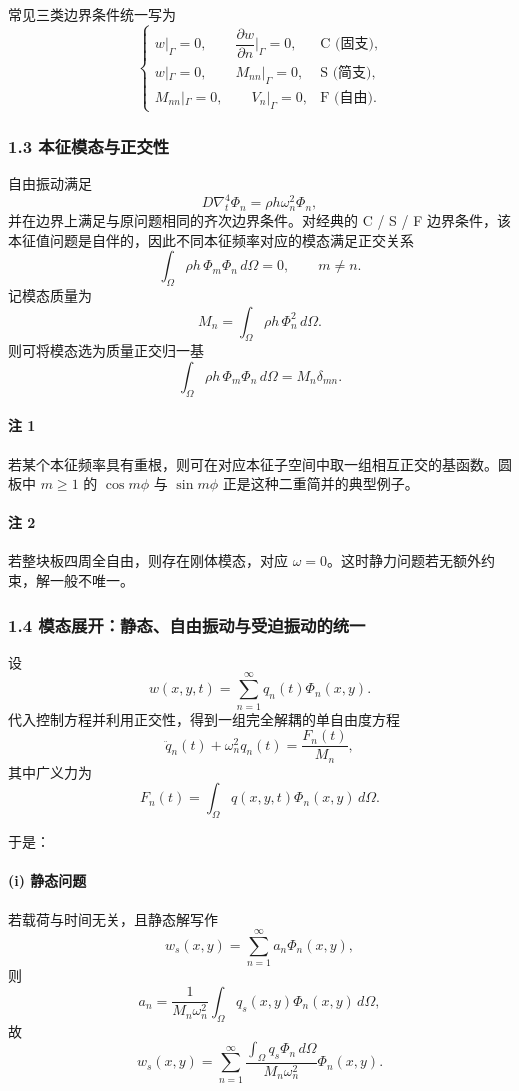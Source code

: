 \documentclass[12pt]{ctexart}
\begin{document}
常见三类边界条件统一写为
\[
\begin{cases}
w|_\Gamma=0,\qquad \dfrac{\partial w}{\partial n}\bigg|_\Gamma=0, & \text{C (固支)},\\[8pt]
w|_\Gamma=0,\qquad M_{nn}|_\Gamma=0, & \text{S (简支)},\\[8pt]
M_{nn}|_\Gamma=0,\qquad V_n|_\Gamma=0, & \text{F (自由)}.
\end{cases}
\]

\subsubsection*{1.3 本征模态与正交性}
自由振动满足
\[
D\nabla_t^4\Phi_n=\rho h \omega_n^2 \Phi_n,
\]
并在边界上满足与原问题相同的齐次边界条件。对经典的 C / S / F 边界条件，该本征值问题是自伴的，因此不同本征频率对应的模态满足正交关系
\[
\int_\Omega \rho h\, \Phi_m \Phi_n \, d\Omega = 0,
\qquad m\neq n.
\]
记模态质量为
\[
M_n=\int_\Omega \rho h\, \Phi_n^2\, d\Omega.
\]
则可将模态选为质量正交归一基
\[
\int_\Omega \rho h\, \Phi_m \Phi_n\, d\Omega = M_n\delta_{mn}.
\]

\paragraph{注 1}
若某个本征频率具有重根，则可在对应本征子空间中取一组相互正交的基函数。圆板中 \(m\ge 1\) 的 \(\cos m\phi\) 与 \(\sin m\phi\) 正是这种二重简并的典型例子。

\paragraph{注 2}
若整块板四周全自由，则存在刚体模态，对应 \(\omega=0\)。这时静力问题若无额外约束，解一般不唯一。

\subsubsection*{1.4 模态展开：静态、自由振动与受迫振动的统一}
设
\[
w(x,y,t)=\sum_{n=1}^\infty q_n(t)\Phi_n(x,y).
\]
代入控制方程并利用正交性，得到一组完全解耦的单自由度方程
\[
\ddot q_n(t)+\omega_n^2 q_n(t)=\frac{F_n(t)}{M_n},
\]
其中广义力为
\[
F_n(t)=\int_\Omega q(x,y,t)\Phi_n(x,y)\, d\Omega.
\]

于是：

\paragraph{(i) 静态问题}
若载荷与时间无关，且静态解写作
\[
w_s(x,y)=\sum_{n=1}^\infty a_n\Phi_n(x,y),
\]
则
\[
a_n=\frac{1}{M_n\omega_n^2}\int_\Omega q_s(x,y)\Phi_n(x,y)\, d\Omega,
\]
故
\[
w_s(x,y)=
\sum_{n=1}^\infty
\frac{\displaystyle \int_\Omega q_s \Phi_n\, d\Omega}
{M_n\omega_n^2}
\Phi_n(x,y).
\]
\end{document}
